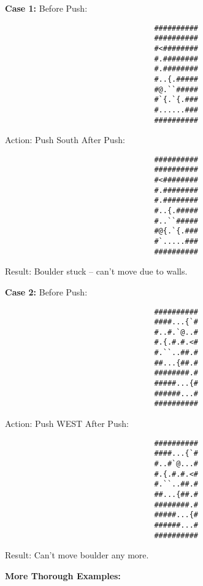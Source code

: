 \begin{MyGreenBox}
	\textbf{Case 1:} Before Push:
	\begin{verbatim}
                                  ##########
                                  ##########
                                  #<########
                                  #.########
                                  #.########
                                  #..{.#####
                                  #@.``#####
                                  #`{.`{.###
                                  #......###
                                  ##########
\end{verbatim}
	Action: Push South After Push:
	\begin{verbatim}
                                  ##########
                                  ##########
                                  #<########
                                  #.########
                                  #.########
                                  #..{.#####
                                  #..``#####
                                  #@{.`{.###
                                  #`.....###
                                  ##########
\end{verbatim}
	Result: Boulder stuck – can’t move due to walls.

	\textbf{Case 2:} Before Push: \begin{verbatim}
                                  ##########
                                  ####...{`#
                                  #..#.`@..#
                                  #.{.#.#.<#
                                  #.``..##.#
                                  ##...{##.#
                                  ########.#
                                  #####...{#
                                  ######...#
                                  ##########
\end{verbatim}
	Action: Push WEST After Push: \begin{verbatim}
                                  ##########
                                  ####...{`#
                                  #..#`@...#
                                  #.{.#.#.<#
                                  #.``..##.#
                                  ##...{##.#
                                  ########.#
                                  #####...{#
                                  ######...#
                                  ##########
\end{verbatim}
	Result: Can’t move boulder any more.

	\textbf{More Thorough Examples:}


\end{MyGreenBox}

